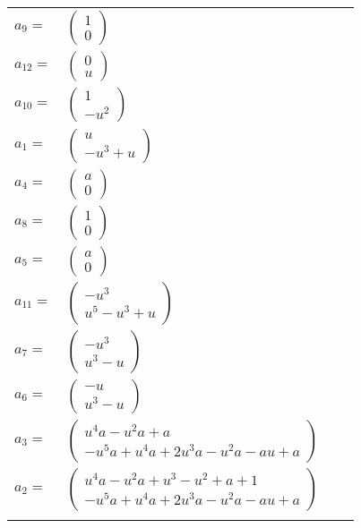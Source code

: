 \documentclass[1p]{elsarticle_modified}
\theoremstyle{definition}
\begin{document}
\begin{tabular}{m{7pt} m{180pt} m{7pt} m{180pt} }
\flushright $a_{9}=$&$\begin{pmatrix}1\\0\end{pmatrix}$ \\
\flushright $a_{12}=$&$\begin{pmatrix}0\\u\end{pmatrix}$ \\
\flushright $a_{10}=$&$\begin{pmatrix}1\\- u^2\end{pmatrix}$ \\
\flushright $a_{1}=$&$\begin{pmatrix}u\\- u^3+u\end{pmatrix}$ \\
\flushright $a_{4}=$&$\begin{pmatrix}a\\0\end{pmatrix}$ \\
\flushright $a_{8}=$&$\begin{pmatrix}1\\0\end{pmatrix}$ \\
\flushright $a_{5}=$&$\begin{pmatrix}a\\0\end{pmatrix}$ \\
\flushright $a_{11}=$&$\begin{pmatrix}- u^3\\u^5- u^3+u\end{pmatrix}$ \\
\flushright $a_{7}=$&$\begin{pmatrix}- u^3\\u^3- u\end{pmatrix}$ \\
\flushright $a_{6}=$&$\begin{pmatrix}- u\\u^3- u\end{pmatrix}$ \\
\flushright $a_{3}=$&$\begin{pmatrix}u^4 a- u^2 a+a\\- u^5 a+u^4 a+2 u^3 a- u^2 a- a u+a\end{pmatrix}$ \\
\flushright $a_{2}=$&$\begin{pmatrix}u^4 a- u^2 a+u^3- u^2+a+1\\- u^5 a+u^4 a+2 u^3 a- u^2 a- a u+a\end{pmatrix}$\\&\end{tabular}
\end{document}
